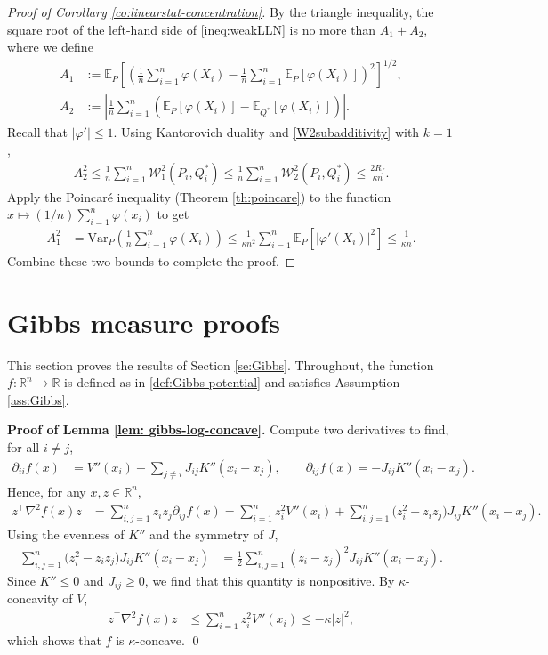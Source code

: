 \documentclass[11pt,reqno]{amsart}
\numberwithin{equation}{section}
\theoremstyle{definition}
\def\E{{\mathbb E}}
\def\R{{\mathbb R}}
\def\Var{{\mathrm{Var}}}
\begin{document}
\begin{proof}[Proof of Corollary \ref{co:linearstat-concentration}]
	By the triangle inequality, the square root of the left-hand side of \eqref{ineq:weakLLN} is no more than $A_1+A_2$,
	where we define
	\begin{align*}
		A_1 &:= \E_P\left[ \left(\frac{1}{n}\sum_{i=1}^n\varphi(X_i) - \frac{1}{n}\sum_{i=1}^n\E_P[\varphi(X_i)]\right)^2\right]^{1/2}, \\
		A_2 &:=  \left|\frac{1}{n}\sum_{i=1}^n (\E_P[\varphi(X_i)] - \E_{Q^*}[\varphi(X_i)])\right|.
	\end{align*}
	Recall that $|\varphi'| \le 1$.
	Using Kantorovich duality and  \eqref{W2subadditivity} with $k=1$,
	\begin{align*}
		A_2^2 \le \frac{1}{n}\sum_{i=1}^n\mathcal{W}_1^2(P_i,Q^*_i) \le  \frac{1}{n}\sum_{i=1}^n\mathcal{W}_2^2(P_i,Q^*_i)   \le  \frac{2R_f}{\kappa n}.
	\end{align*}
	Apply the Poincar\'e inequality (Theorem \ref{th:poincare}) to the function $x \mapsto (1/n)\sum_{i=1}^n \varphi(x_i)$ to get
	\begin{align*}
		A_1^2 &= \Var_P\left( \frac{1}{n}\sum_{i=1}^n\varphi(X_i)\right) \le \frac{1}{\kappa n^2}\sum_{i=1}^n \E_P[| \varphi'(X_i)|^2] \le \frac{1}{\kappa n}.
	\end{align*}
	Combine these two bounds to complete the proof.
\end{proof}


\section{Gibbs measure proofs} \label{sec: proofs-gibbs}

This section proves the results of Section \ref{se:Gibbs}. Throughout, the function $f : \R^n \to \R$ is defined as in \eqref{def:Gibbs-potential} 
 and satisfies Assumption \ref{ass:Gibbs}. 

\noindent\textbf{Proof of Lemma \ref{lem: gibbs-log-concave}.}
Compute two derivatives to find, for all $i \neq j$,
\begin{align*}
	\partial_{ii}f(x) &= V''(x_i) + \sum_{j \neq i} J_{ij}K''(x_i-x_j), \qquad  
	\partial_{ij}f(x) = -J_{ij}K''(x_i-x_j).
\end{align*}
Hence, for any $x,z \in \R^n$,
\begin{align*}
	z^\top\nabla^2f(x) z &= \sum_{i,j=1}^n z_iz_j\partial_{ij}f(x) = \sum_{i=1}^n z_i^2V''(x_i) + \sum_{i,j=1}^n \big(z_i^2 - z_iz_j\big) J_{ij} K''(x_i-x_j).
\end{align*}
Using the evenness of $K''$ and the symmetry of $J$, 
\begin{align*}
	\sum_{i,j=1}^n \big(z_i^2 - z_iz_j\big) J_{ij} K''(x_i-x_j) &= \frac12\sum_{i,j=1}^n (z_i - z_j)^2 J_{ij} K''(x_i-x_j).
\end{align*}
Since $K'' \le 0$ and $J_{ij} \ge 0$, we find that this quantity is nonpositive. By $\kappa$-concavity of $V$,
\begin{align*}
	z^\top\nabla^2f(x) z &\le \sum_{i=1}^n z_i^2V''(x_i) \le -\kappa |z|^2,
\end{align*}
which shows that $f$ is $\kappa$-concave. \hfill \qed
\end{document}

